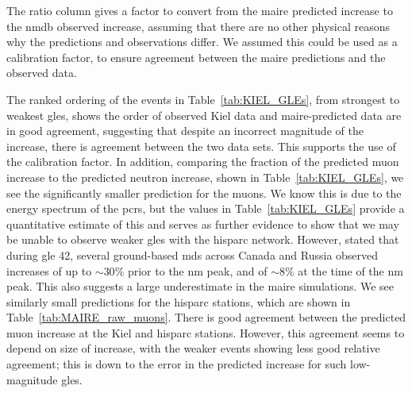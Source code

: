 The ratio column gives a factor to convert from the \gls{maire} predicted increase to the \gls{nmdb} observed increase, assuming that there are no other physical reasons why the predictions and observations differ. We assumed this could be used as a calibration factor, to ensure agreement between the \gls{maire} predictions and the observed data.

The ranked ordering of the events in Table~\ref{tab:KIEL_GLEs}, from strongest to weakest \glspl{gle}, shows the order of observed Kiel data and \gls{maire}-predicted data are in good agreement, suggesting that despite an incorrect magnitude of the increase, there is agreement between the two data sets. This supports the use of the calibration factor. In addition, comparing the fraction of the predicted muon increase to the predicted neutron increase, shown in Table~\ref{tab:KIEL_GLEs}, we see the significantly smaller prediction for the muons. We know this is due to the energy spectrum of the \glspl{pcr}, but the values in Table~\ref{tab:KIEL_GLEs} provide a quantitative estimate of this and serves as further evidence to show that we may be unable to observe weaker \glspl{gle} with the \gls{hisparc} network. However, \citet{lovell_extended_1998} stated that during \gls{gle} 42, several ground-based \glspl{md} across Canada and Russia observed increases of up to $\sim30\%$ prior to the \gls{nm} peak, and of $\sim8\%$ at the time of the \gls{nm} peak. This also suggests a large underestimate in the \gls{maire} simulations. We see similarly small predictions for the \gls{hisparc} stations, which are shown in Table~\ref{tab:MAIRE_raw_muons}. There is good agreement between the predicted muon increase at the Kiel and \gls{hisparc} stations. However, this agreement seems to depend on size of increase, with the weaker events showing less good relative agreement; this is down to the error in the predicted increase for such low-magnitude \glspl{gle}.

\vspace{1em}

